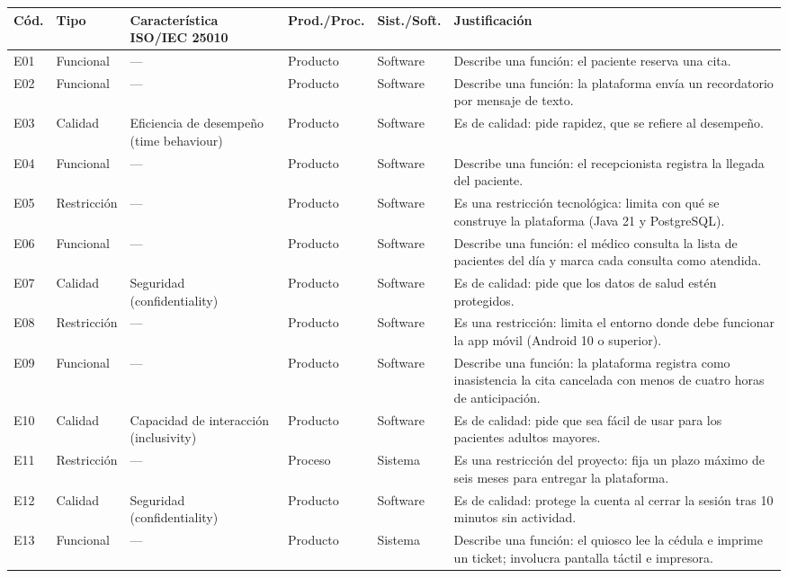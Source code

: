 \documentclass[11pt,a4paper]{article}
\begin{document}
\small
\begin{longtable}{@{}l p{2.3cm} p{5cm} p{2cm} p{2.2cm} p{7.5cm}@{}}
\toprule
\textbf{Cód.} & \textbf{Tipo} & \textbf{Característica ISO/IEC 25010} & \textbf{Prod./Proc.} & \textbf{Sist./Soft.} & \textbf{Justificación} \\
\midrule
\endhead
E01 & Funcional & --- & Producto & Software & Describe una función: el paciente reserva una cita. \\
E02 & Funcional & --- & Producto & Software & Describe una función: la plataforma envía un recordatorio por mensaje de texto. \\
E03 & Calidad & Eficiencia de desempeño (time behaviour) & Producto & Software & Es de calidad: pide rapidez, que se refiere al desempeño. \\
E04 & Funcional & --- & Producto & Software & Describe una función: el recepcionista registra la llegada del paciente. \\
E05 & Restricción & --- & Producto & Software & Es una restricción tecnológica: limita con qué se construye la plataforma (Java 21 y PostgreSQL). \\
E06 & Funcional & --- & Producto & Software & Describe una función: el médico consulta la lista de pacientes del día y marca cada consulta como atendida. \\
E07 & Calidad & Seguridad (confidentiality) & Producto & Software & Es de calidad: pide que los datos de salud estén protegidos. \\
E08 & Restricción & --- & Producto & Software & Es una restricción: limita el entorno donde debe funcionar la app móvil (Android 10 o superior). \\
E09 & Funcional & --- & Producto & Software & Describe una función: la plataforma registra como inasistencia la cita cancelada con menos de cuatro horas de anticipación. \\
E10 & Calidad & Capacidad de interacción (inclusivity) & Producto & Software & Es de calidad: pide que sea fácil de usar para los pacientes adultos mayores. \\
E11 & Restricción & --- & Proceso & Sistema & Es una restricción del proyecto: fija un plazo máximo de seis meses para entregar la plataforma. \\
E12 & Calidad & Seguridad (confidentiality) & Producto & Software & Es de calidad: protege la cuenta al cerrar la sesión tras 10 minutos sin actividad. \\
E13 & Funcional & --- & Producto & Sistema & Describe una función: el quiosco lee la cédula e imprime un ticket; involucra pantalla táctil e impresora. \\

\end{longtable}
\end{document}
